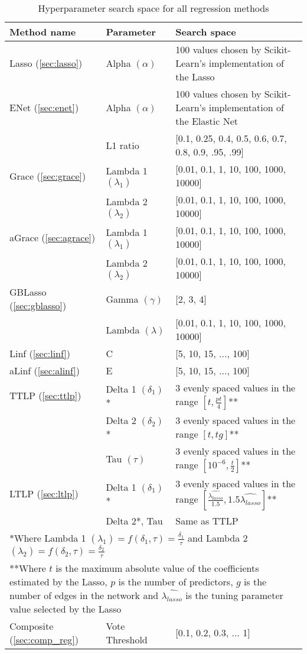 {\def\arraystretch{1.5}\tabcolsep=10pt
	\begin{table}[p]
		\label{tab:tuning_values}
		\caption{Hyperparameter search space for all regression methods}
		\centering
		\begin{tabular}{l p{2.8cm} p{6.3cm}}
			\hline\hline 
			Method name & Parameter & Search space \\
			\hline\hline
			Lasso (\ref{sec:lasso})		&Alpha $(\alpha)$&100 values chosen by Scikit-Learn's implementation of the Lasso\\
			\hline
			ENet (\ref{sec:enet})	&Alpha $(\alpha)$&100 values chosen by Scikit-Learn's implementation of the Elastic Net\\
			&L1 ratio&[0.1, 0.25, 0.4, 0.5, 0.6, 0.7, 0.8, 0.9, .95, .99]\\
			\hline
			Grace (\ref{sec:grace})			&Lambda 1 $(\lambda_1)$&[0.01, 0.1, 1, 10, 100, 1000, 10000]\\
			&Lambda 2  $(\lambda_2)$&[0.01, 0.1, 1, 10, 100, 1000, 10000]\\
			\hline
			aGrace (\ref{sec:agrace})		&Lambda 1 $(\lambda_1)$&[0.01, 0.1, 1, 10, 100, 1000, 10000]\\
			&Lambda 2  $(\lambda_2)$&[0.01, 0.1, 1, 10, 100, 1000, 10000]\\
			\hline
			GBLasso (\ref{sec:gblasso})		&Gamma $(\gamma)$&[2, 3, 4]\\
			&Lambda $(\lambda)$&[0.01, 0.1, 1, 10, 100, 1000, 10000]\\
			\hline
			Linf (\ref{sec:linf})			&C&[5, 10, 15, ..., 100]\\
			\hline
			aLinf (\ref{sec:alinf})			&E&[5, 10, 15, ..., 100]\\
			\hline
			TTLP (\ref{sec:ttlp})			&Delta 1 $(\delta_1)$*&3 evenly spaced values in the range $[t,\frac{pt}{4}]$**\\
			&Delta 2 $(\delta_2)$*&3 evenly spaced values in the range $[t,tg]$**\\
			&Tau $(\tau)$&3 evenly spaced values in the range $[10^{-6},\frac{t}{2}]$**\\
			\hline
			LTLP (\ref{sec:ltlp})			&Delta 1 $(\delta_1)$*&3 evenly spaced values in the range $[\frac{\hat{\lambda_{lasso}}}{1.5},1.5\hat{\lambda_{lasso}}]$**\\
			&Delta 2*, Tau&Same as TTLP\\
			\multicolumn{3}{p{13.5cm}}{*Where Lambda 1 $(\lambda_1) = f(\delta_1,\tau) = \frac{\delta_1}{\tau}$ and Lambda 2 $(\lambda_2) = f(\delta_2,\tau) = \frac{\delta_2}{\tau}$}\\
			\multicolumn{3}{p{13.5cm}}{**Where $t$ is the maximum absolute value of the coefficients estimated by the Lasso, $p$ is the number of predictors, $g$ is the number of edges in the network and $\hat{\lambda_{lasso}}$ is the tuning parameter value selected by the Lasso}\\
			\hline
			Composite (\ref{sec:comp_reg})	&Vote Threshold&[0.1, 0.2, 0.3, ... 1]\\
			\hline
		\end{tabular}
	\end{table}
}